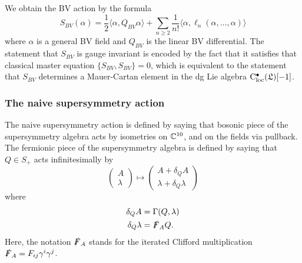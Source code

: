 \documentclass[10pt, oneside]{article}
\def\<{\langle}
\def\>{\rangle}
\def\cloc{{\rm C}_{\rm loc}}
\def\bu{\bullet}
\begin{document}
\begin{rmk}
We obtain the BV action by the formula
\[
S_{BV} (\alpha) = \frac{1}{2} \<\alpha , Q_{BV} \alpha\> + \sum_{n \geq 2} \frac{1}{n!} \<\alpha, \ell_n(\alpha,\ldots, \alpha)\> 
\]
where $\alpha$ is a general BV field and $Q_{BV}$ is the linear BV differential. 
The statement that $S_{BV}$ is gauge invariant is encoded by the fact that it satisfies that classical master equation $\{S_{BV}, S_{BV}\} = 0$, which is equivalent to the statement that $S_{BV}$ determines a Mauer-Cartan element in the dg Lie algebra $\cloc^\bu(\fL)[-1]$. 

\subsubsection{The naive supersymmetry action}

The naive supersymmetry action is defined by saying that bosonic piece of the supersymmetry algebra acts by isometries on $\mathbb C^{10}$, and on the fields via pullback. 
The fermionic piece of the supersymmetry algebra is defined by saying that $Q \in S_+$ acts infinitesimally by
\[
\begin{pmatrix}
A \\ \lambda
\end{pmatrix}
\mapsto
\begin{pmatrix} A + \delta_Q A \\
\lambda + \delta_Q \lambda
\end{pmatrix}
\]
where 
\begin{align*}
\delta_Q A &= \Gamma(Q,\lambda) \\
\delta_Q \lambda &= \slashed{F}_A Q .
\end{align*}
Here, the notation $\slashed{F}_A$ stands for the iterated Clifford multiplication $\slashed{F}_A = F_{ij} \gamma^i \gamma^j$.  


\end{rmk}
\end{document}

